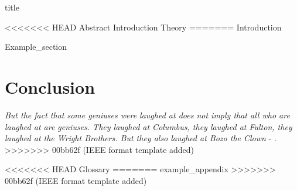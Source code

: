 \documentclass{article}
\begin{document}
{title}

\frontmatter

\tableofcontents

\listoffigures
\listoftables

\mainmatter

<<<<<<< HEAD
{Abstract}
{Introduction}
{Theory}
=======
{Introduction}

{Example_section}

\section{Conclusion}
\textit{But the fact that some geniuses were laughed at does not imply that all who are laughed at are geniuses. They laughed at Columbus, they laughed at Fulton, they laughed at the Wright Brothers. But they also laughed at Bozo the Clown} -  \textcite{sagan_1993}.
>>>>>>> 00bb62f (IEEE format template added)

\newpage
\printbibliography[heading = bibintoc, title = Bibliography]    %

\addappendix
<<<<<<< HEAD
{Glossary}
=======
{example_appendix}
>>>>>>> 00bb62f (IEEE format template added)

\end{document}
